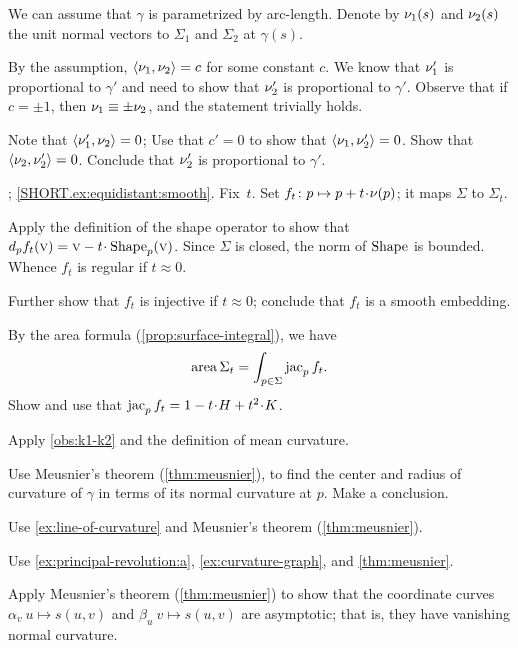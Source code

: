 \begin{multicols}{2}
We can assume that $\gamma$ is parametrized by arc-length.
Denote by $\nu_1(s)$ and $\nu_2(s)$ the unit normal vectors to $\Sigma_1$ and $\Sigma_2$ at $\gamma(s)$.

By the assumption, $\langle \nu_1,\nu_2\rangle= c$ for some constant $c$.
We know that
$\nu_1'$ is proportional to $\gamma'$ and need to show that $\nu_2'$ is proportional to $\gamma'$.
Observe that if $c=\pm1$, then $\nu_1\equiv\pm \nu_2$, and the statement trivially holds.

Note that $\langle\nu_1',\nu_2\rangle=0$;
Use that $c'=0$ to show that $\langle\nu_1,\nu_2'\rangle=0$.
Show that $\langle\nu_2,\nu_2'\rangle=0$.
Conclude that $\nu_2'$ is proportional to $\gamma'$.

\parbf{\ref{ex:equidistant}};
\ref{SHORT.ex:equidistant:smooth}.
Fix~$t$.
Set $f_t\:p\mapsto p+t\cdot\Norm(p)$; it maps $\Sigma$ to $\Sigma_t$.

Apply the definition of the shape operator to show that $d_pf_t(\vec v)=\vec v-t\cdot\Shape_p(\vec v)$.
Since $\Sigma$ is closed, the norm of $\mathop{\rm Shape}\nolimits$ is bounded.
Whence $f_t$ is regular if $t\approx 0$.

Further show that $f_t$ is injective if $t\approx0$;
conclude that $f_t$ is a smooth embedding.

 By the area formula (\ref{prop:surface-integral}), we have
\[\mathop{\rm area}\nolimits\Sigma_t=\int_{p\in \Sigma}\mathop{\rm jac}\nolimits_pf_t.\]
Show and use that $\jac_pf_t=1-t\cdot H+t^2\cdot K$.

Apply \ref{obs:k1-k2} and the definition of mean curvature.

Use Meusnier's theorem (\ref{thm:meusnier}), to find the center and radius of curvature of $\gamma$ in terms of its normal curvature at $p$.
Make a conclusion.

Use \ref{ex:line-of-curvature} and Meusnier's theorem (\ref{thm:meusnier}).

Use \ref{ex:principal-revolution:a},  \ref{ex:curvature-graph}, and \ref{thm:meusnier}.

 Apply Meusnier's theorem (\ref{thm:meusnier}) to show that the coordinate curves $\alpha_v\:u\mapsto s(u,v)$ and $\beta_u\:v\mapsto s(u,v)$ are asymptotic; that is, they have vanishing normal curvature.


\end{multicols}
